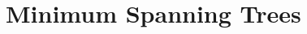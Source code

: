 \documentclass[../../main.tex]{subfiles}
\begin{document}
\section{Minimum Spanning Trees}
\end{document}
